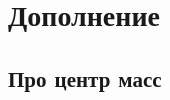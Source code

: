 \documentclass[a4paper,12pt]{article}
\begin{document}
  
  
  \begin{problem}[1.37]
  
  \end{problem}
  
  \begin{solution}
  
  \end{solution}
  
  
  
  \begin{problem}[1.36]
  
  \end{problem}
  
  \begin{solution}
  
  \end{solution}
  
  
  
  \section{Дополнение}
  
  \subsection{Про центр масс}
  
  
\end{document}
